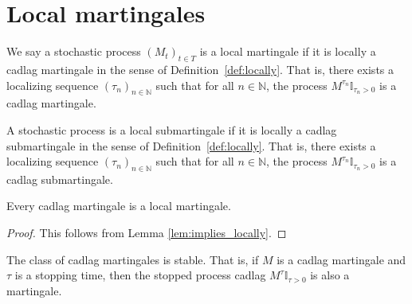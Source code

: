 \section{Local martingales}

\begin{definition}\label{def:IsLocalMartingale}
  \leanok
  We say a stochastic process $(M_t)_{t \in T}$ is a local martingale if it is locally a cadlag martingale in the sense of
  Definition~\ref{def:locally}. That is, there exists a localizing sequence $(\tau_n)_{n \in \mathbb{N}}$ such that for all $n \in \mathbb{N}$, the process $M^{\tau_n}\mathbb{I}_{\tau_n > 0}$ is a cadlag martingale.
\end{definition}


\begin{definition}\label{def:IsLocalSubmartingale}
  \leanok
A stochastic process is a local submartingale if it is locally a cadlag submartingale in the sense of Definition~\ref{def:locally}.
That is, there exists a localizing sequence $(\tau_n)_{n \in \mathbb{N}}$ such that for all $n \in \mathbb{N}$, the process $M^{\tau_n}\mathbb{I}_{\tau_n > 0}$ is a cadlag submartingale.
\end{definition}


\begin{lemma}\label{lem:Martingale.IsLocalMartingale}
  \leanok
Every cadlag martingale is a local martingale.
\end{lemma}

\begin{proof}\leanok
This follows from Lemma \ref{lem:implies_locally}.
\end{proof}


\begin{lemma}\label{lem:stable_IsMartingale}
  \leanok
The class of cadlag martingales is stable. That is, if $M$ is a cadlag martingale and $\tau$ is a stopping time, then the stopped process cadlag $M^{\tau}\mathbb{I}_{\tau > 0}$ is also a martingale.
\end{lemma}

